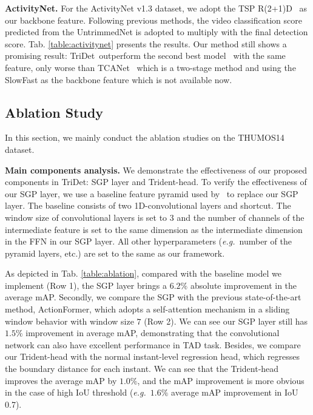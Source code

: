\documentclass[10pt,twocolumn,letterpaper]{article}
\def\eg{{\em e.g.}}
\newcommand{\tabref}[1]{Tab. \ref{#1}}
\newcommand{\myPara}[1]{\vspace{.05in}\noindent\textbf{#1}}
\def\name{TriDet}
\begin{document}
\myPara{ActivityNet.} For the ActivityNet v1.3 dataset, we adopt the TSP R(2+1)D~\cite{alwassel2021tsp} as our backbone feature. Following previous methods\cite{zhang2022actionformer,cheng2022tallformer, qing2021temporal, liu2022end,lin2021learning}, the video classification score predicted from the UntrimmedNet is adopted to multiply with the final detection score. \tabref{table:activitynet} presents the results. Our method still shows a promising result: \name~outperform the second best model~\cite{zhang2022actionformer} with the same feature, only worse than TCANet~\cite{qing2021temporal} which is a two-stage method and using the SlowFast as the backbone feature which is not available now. 


\subsection{Ablation Study}
In this section, we mainly conduct the ablation studies on the THUMOS14 dataset.

\myPara{Main components analysis.}
We demonstrate the effectiveness of our proposed components in \name: SGP layer and Trident-head. To verify the effectiveness of our SGP layer, we use a baseline feature pyramid used by~\cite{lin2021learning, zhang2022actionformer} to replace our SGP layer. The baseline consists of two 1D-convolutional layers and shortcut. The window size of convolutional layers is set to 3 and the number of channels of the intermediate feature is set to the same dimension as the intermediate dimension in the FFN in our SGP layer. All other hyperparameters (\eg~number of the pyramid layers, etc.) are set to the same as our framework.

As depicted in \tabref{table:ablation}, compared with the baseline model we implement (Row 1), the SGP layer brings a $6.2\%$ absolute improvement in the average mAP. Secondly, we compare the SGP with the previous state-of-the-art method, ActionFormer, which adopts a self-attention mechanism in a sliding window behavior\cite{beltagy2020longformer} with window size $7$ (Row 2). We can see our SGP layer still has $1.5\%$ improvement in average mAP, demonstrating that the convolutional network can also have excellent performance in TAD task. Besides, we compare our Trident-head with the normal instant-level regression head, which regresses the boundary distance for each instant. We can see that the Trident-head improves the average mAP by $1.0\%$, and the mAP improvement is more obvious in the case of high IoU threshold (\eg~$1.6\%$ average mAP improvement in IoU 0.7). 
\end{document}
